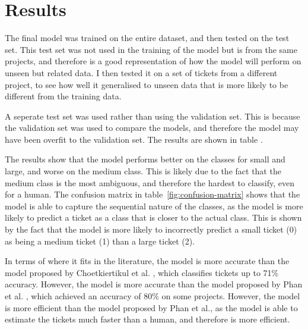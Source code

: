 \documentclass{UoYCSproject}
\begin{document}
    \section{Results}\label{sec:results}
The final model was trained on the entire dataset, and then tested on the test set.
    This test set was not used in the training of the model but is from the same projects, and therefore is a good representation of how the model will perform on unseen but related data.
    I then tested it on a set of tickets from a different project, to see how well it generalised to unseen data that is more likely to be different from the training data.

    A seperate test set was used rather than using the validation set. This is because the validation set was used to compare the models, and therefore the model may have been overfit to the validation set.
    The results are shown in table .

    The results show that the model performs better on the classes for small and large, and worse on the medium class.
    This is likely due to the fact that the medium class is the most ambiguous, and therefore the hardest to classify, even for a human.
    The confusion matrix in table~\ref{fig:confusion-matrix} shows that the model is able to capture the sequential nature of the classes, as the model is more likely to predict a ticket as a class that is closer to the actual class.
    This is shown by the fact that the model is more likely to incorrectly predict a small ticket (0) as being a medium ticket (1) than a large ticket (2).

    In terms of where it fits in the literature, the model is more accurate than the model proposed by Choetkiertikul et al. \cite{8255666}, which classifies tickets up to 71\% accuracy. However, the model is more accurate than the model proposed by Phan et al. \cite{phan2022story}, which achieved an accuracy of 80\% on some projects. However, the model is more efficient than the model proposed by Phan et al., as the model is able to estimate the tickets much faster than a human, and therefore is more efficient.
\end{document}
